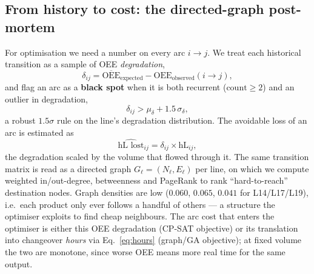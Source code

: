 \documentclass[11pt,a4paper]{article}
\begin{document}
\subsection{From history to cost: the directed-graph post-mortem}\label{sec:postmortem}
For optimisation we need a number on every arc $i\!\to\!j$. We treat each
historical transition as a sample of OEE \emph{degradation},
\begin{equation}
\delta_{ij}=\overline{\text{OEE}}_{\text{expected}}-\text{OEE}_{\text{observed}}(i\!\to\!j),
\end{equation}
and flag an arc as a \textbf{black spot} when it is both recurrent ($\text{count}\ge2$)
and an outlier in degradation,
\begin{equation}
\delta_{ij}>\mu_\delta+1.5\,\sigma_\delta ,
\label{eq:blackspot}
\end{equation}
a robust $1.5\sigma$ rule on the line's degradation distribution. The avoidable
loss of an arc is estimated as
\begin{equation}
\widehat{\text{hL lost}}_{ij}=\delta_{ij}\times \text{hL}_{ij},
\end{equation}
the degradation scaled by the volume that flowed through it. The same transition
matrix is read as a directed graph $G_\ell=(N_\ell,E_\ell)$ per line, on which we
compute weighted in/out-degree, betweenness and PageRank to rank ``hard-to-reach''
destination nodes. Graph densities are low ($0.060$, $0.065$, $0.041$ for
L14/L17/L19), i.e.\ each product only ever follows a handful of others --- a
structure the optimiser exploits to find cheap neighbours. The arc cost that
enters the optimiser is either this OEE degradation (CP-SAT objective) or its
translation into changeover \emph{hours} via Eq.~\eqref{eq:hours} (graph/GA
objective); at fixed volume the two are monotone, since worse OEE means more real
time for the same output.
\end{document}
